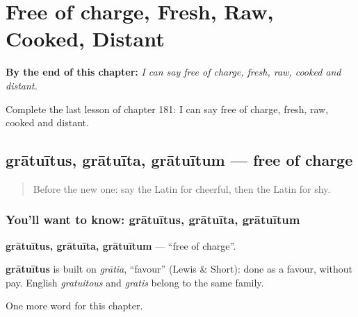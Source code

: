 
\chapter{Free of charge, Fresh, Raw, Cooked, Distant}
\label{ch:la-free-of-charge-fresh-raw-cooked-distant}

\begin{chapteropening}
\textbf{By the end of this chapter:} \emph{I can say free of charge, fresh, raw, cooked and distant.}

Complete the last lesson of chapter 181: I can say free of charge, fresh, raw, cooked and distant.
\end{chapteropening}

\section[grātuītus, grātuīta, grātuītum]{grātuītus, grātuīta, grātuītum — free of charge}

\label{lesson:LA-C181-gratuitus}



\begin{quote}
Before the new one: say the Latin for cheerful, then the Latin for shy.
\end{quote}

\subsection*{You'll want to know: grātuītus, grātuīta, grātuītum}
\textbf{grātuītus, grātuīta, grātuītum} — \textquotedblleft{}free of charge\textquotedblright{}.

\begin{cousinweb}
\textbf{grātuītus} is built on \emph{grātia}, \textquotedblleft{}favour\textquotedblright{} (Lewis \& Short): done as a favour, without pay. English \emph{gratuitous} and \emph{gratis} belong to the same family.
\end{cousinweb}

\begin{grammarlens}[title={What you've built}]
One more word for this chapter.
\end{grammarlens}

